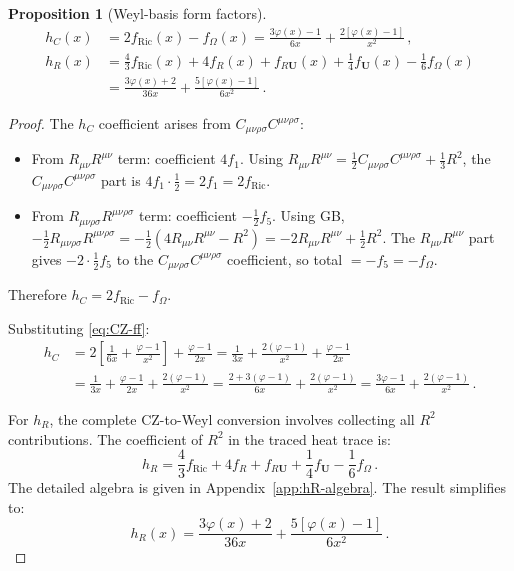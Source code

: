 \documentclass[11pt,a4paper]{article}
\newcommand{\Ricsq}{R_{\mu\nu}R^{\mu\nu}}
\newcommand{\Rsq}{R_{\mu\nu\rho\sigma}R^{\mu\nu\rho\sigma}}
\newcommand{\Weylsq}{C_{\mu\nu\rho\sigma}C^{\mu\nu\rho\sigma}}
\newtheorem{proposition}[theorem]{Proposition}
\theoremstyle{definition}
\theoremstyle{remark}
\begin{document}
\begin{proposition}[Weyl-basis form factors]
\label{prop:hC-hR}
\begin{equation}
  \boxed{
  \begin{aligned}
  h_C(x) &= 2f_{\mathrm{Ric}}(x) - f_\Omega(x)
  = \frac{3\varphi(x)-1}{6x} + \frac{2[\varphi(x)-1]}{x^2}\,,\\[6pt]
  h_R(x) &= \frac{4}{3}f_{\mathrm{Ric}}(x) + 4f_R(x) + f_{R\mathbf{U}}(x)
  + \frac{1}{4}f_{\mathbf{U}}(x) - \frac{1}{6}f_\Omega(x)\\
  &= \frac{3\varphi(x)+2}{36x} + \frac{5[\varphi(x)-1]}{6x^2}\,.
  \end{aligned}
  }
  \label{eq:hC-hR}
\end{equation}
\end{proposition}

\begin{proof}
The $h_C$ coefficient arises from $\Weylsq$:
\begin{itemize}
\item From $\Ricsq$ term: coefficient $4f_1$.
  Using $\Ricsq = \frac{1}{2}\Weylsq + \frac{1}{3}R^2$,
  the $\Weylsq$ part is $4f_1 \cdot \frac{1}{2} = 2f_1 = 2f_{\text{Ric}}$.
\item From $\Rsq$ term: coefficient $-\frac{1}{2}f_5$.
  Using GB, $-\frac{1}{2}\Rsq = -\frac{1}{2}(4\Ricsq - R^2) = -2\Ricsq + \frac{1}{2}R^2$.
  The $\Ricsq$ part gives $-2 \cdot \frac{1}{2} f_5$ to the $\Weylsq$ coefficient,
  so total $= -f_5 = -f_\Omega$.
\end{itemize}
Therefore $h_C = 2f_{\text{Ric}} - f_\Omega$.

Substituting \eqref{eq:CZ-ff}:
\begin{align*}
h_C &= 2\!\left[\frac{1}{6x} + \frac{\varphi-1}{x^2}\right]
       + \frac{\varphi-1}{2x}
 = \frac{1}{3x} + \frac{2(\varphi-1)}{x^2} + \frac{\varphi-1}{2x}\\
&= \frac{1}{3x} + \frac{\varphi-1}{2x} + \frac{2(\varphi-1)}{x^2}
 = \frac{2 + 3(\varphi-1)}{6x} + \frac{2(\varphi-1)}{x^2}
 = \frac{3\varphi - 1}{6x} + \frac{2(\varphi-1)}{x^2}\,.
\end{align*}

For $h_R$, the complete CZ-to-Weyl conversion involves collecting all
$R^2$ contributions.  The coefficient of $R^2$ in the traced heat trace is:
\begin{equation*}
  h_R = \frac{4}{3}f_{\text{Ric}} + 4f_R + f_{R\mathbf{U}}
  + \frac{1}{4}f_{\mathbf{U}} - \frac{1}{6}f_\Omega\,.
\end{equation*}
The detailed algebra is given in Appendix~\ref{app:hR-algebra}.
The result simplifies to:
\begin{equation*}
  h_R(x) = \frac{3\varphi(x)+2}{36x} + \frac{5[\varphi(x)-1]}{6x^2}\,.
\end{equation*}
\end{proof}
\end{document}
